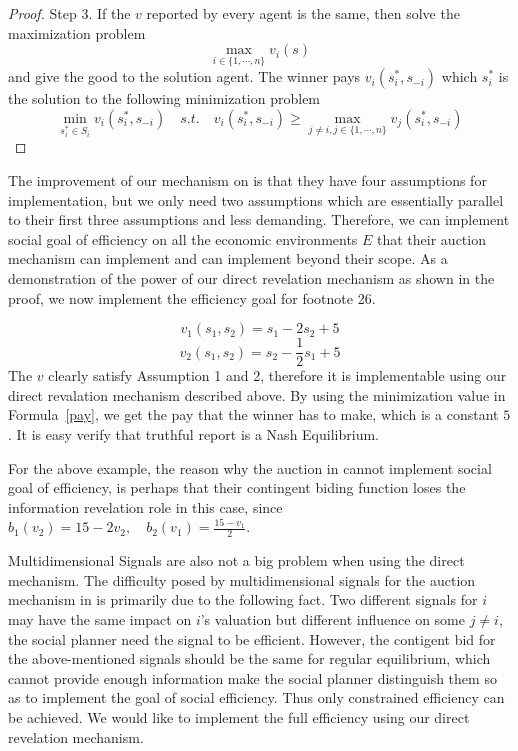 \begin{prop}
\begin{proof}
 Step 3. If the $v$ reported by every agent is the same, then solve the maximization problem 
 $$\max_{i \in \{1,\cdots,n\}}v_i(s)$$
 and give the good to the solution agent. The winner pays $v_i(s_i^*, s_{-i})$ 
 which $s_i^*$ is the solution to the following minimization problem
 \begin{equation}
 \min_{s_i^*\in S_i} v_i(s_i^*, s_{-i})\quad
 s.t.\quad  v_i(s_i^*, s_{-i})\geqslant \max_{j\neq i, j \in \{1,\cdots,n\}} v_j(s_i^*, s_{-i})
 \end{equation}\label{pay}
\end{proof}
The improvement of our mechanism on \parencite{Maskin00} is that they have four assumptions for implementation, but we only need two 
assumptions which are essentially parallel to their first three assumptions and less demanding. Therefore, we can implement social
 goal of efficiency on all the economic  environments $E$ that their auction mechanism can implement and can implement beyond their
 scope. As a demonstration of the power of our direct revelation mechanism as shown in the proof, we now implement the efficiency 
 goal for \parencite{Maskin00} footnote 26.
 
\begin{example}
$$v_1(s_1,s_2)=s_1-2s_2+5$$
$$v_2(s_1,s_2)=s_2-\frac{1}{2}s_1+5$$
The $v$ clearly satisfy Assumption 1 and 2, therefore it is implementable using our direct revalation mechanism described above. By
using the minimization value in Formula~\ref{pay}, we get the pay that the winner has to make,  which is a constant $5$. It is easy
verify that truthful report is a Nash Equilibrium.
 
\end{example}
For the above example, the reason why the auction in \parencite{Maskin00} cannot implement social goal of efficiency, is perhaps that 
their contingent biding function loses the information revelation role in this case, since 
$b_1(v_2)=15-2v_2,\quad b_2(v_1)=\frac{15-v_1}{2}$.

Multidimensional Signals are also not a big problem when using the direct mechanism. The difficulty posed by multidimensional signals
for the auction mechanism in \parencite{Maskin00} is primarily due to the following fact. Two different signals for $i$ may have the same impact on $i$'s 
valuation but different influence on some $j\neq i$, the social planner need the signal to be efficient. However, the contigent bid 
for the above-mentioned signals should be the same for regular equilibrium, which cannot provide enough information make the social 
planner distinguish them so as to implement the goal of social efficiency. Thus only constrained efficiency can be achieved. We would
like to implement the full efficiency using our direct revelation mechanism.


\end{prop}
